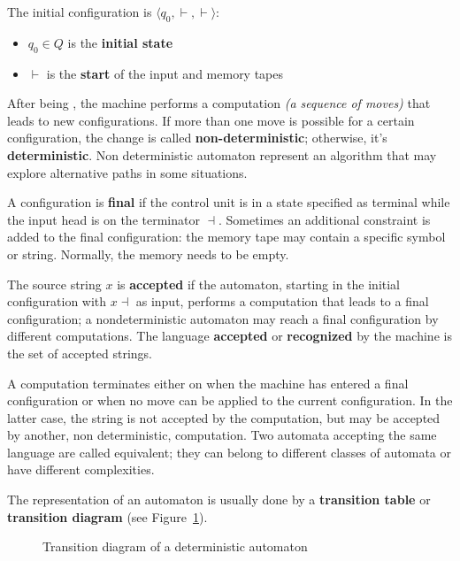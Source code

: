 \documentclass[english]{article}
\begin{document}
The initial configuration is \(\langle q_0, \vdash, \vdash \rangle\):

\begin{itemize}
  \item \(q_0 \in Q\) is the \textbf{initial state}
  \item \(\vdash\) is the \textbf{start} of the input and memory tapes
\end{itemize}

\bigskip
After being , the machine performs a computation \textit{(a sequence of moves)} that leads to new configurations.
If more than one move is possible for a certain configuration, the change is called \textbf{non-deterministic};
otherwise, it's \textbf{deterministic}.
Non deterministic automaton represent an algorithm that may explore alternative paths in some situations.

A configuration is \textbf{final} if the control unit is in a state specified as terminal while the input head is on the terminator \(\dashv\).
Sometimes an additional constraint is added to the final configuration: the memory tape may contain a specific symbol or string.
Normally, the memory needs to be empty.

The source string \(x\) is \textbf{accepted} if the automaton, starting in the initial configuration with \(x \dashv\) as input, performs a computation that leads to a final configuration;
a nondeterministic automaton may reach a final configuration by different computations.
The language \textbf{accepted} or \textbf{recognized} by the machine is the set of accepted strings.

A computation terminates either on when the machine has entered a final configuration or when no move can be applied to the current configuration.
In the latter case, the string is not accepted by the computation, but may be accepted by another, non deterministic, computation.
Two automata accepting the same language are called equivalent;
they can belong to different classes of automata or have different complexities.

\bigskip
The representation of an automaton is usually done by a \textbf{transition table} or \textbf{transition diagram} (see Figure~\ref{fig:transition-diagram}).

\begin{figure}[htbp]
  \centering
  \bigskip
  \bigskip
  \caption{Transition diagram of a deterministic automaton}
  \label{fig:transition-diagram}
\end{figure}
\end{document}
